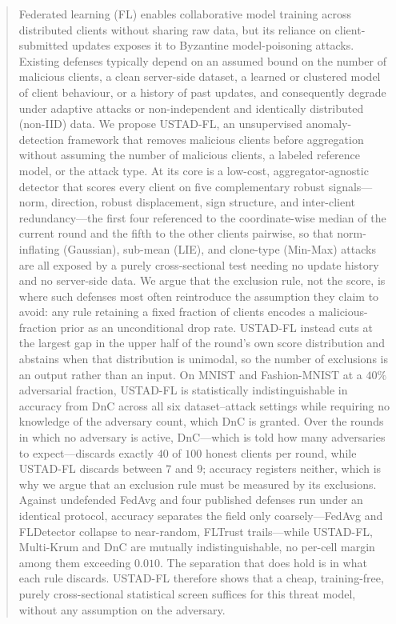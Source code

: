 \documentclass[journal]{IEEEtran}
\begin{document}
\begin{abstract}
Federated learning (FL) enables collaborative model training across distributed clients without sharing raw data, but its reliance on client-submitted updates exposes it to Byzantine model-poisoning attacks. Existing defenses typically depend on an assumed bound on the number of malicious clients, a clean server-side dataset, a learned or clustered model of client behaviour, or a history of past updates, and consequently degrade under adaptive attacks or non-independent and identically distributed (non-IID) data. We propose USTAD-FL, an unsupervised anomaly-detection framework that removes malicious clients before aggregation without assuming the number of malicious clients, a labeled reference model, or the attack type. At its core is a low-cost, aggregator-agnostic detector that scores every client on five complementary robust signals---norm, direction, robust displacement, sign structure, and inter-client redundancy---the first four referenced to the coordinate-wise median of the current round and the fifth to the other clients pairwise, so that norm-inflating (Gaussian), sub-mean (LIE), and clone-type (Min-Max) attacks are all exposed by a purely cross-sectional test needing no update history and no server-side data. We argue that the exclusion rule, not the score, is where such defenses most often reintroduce the assumption they claim to avoid: any rule retaining a fixed fraction of clients encodes a malicious-fraction prior as an unconditional drop rate. USTAD-FL instead cuts at the largest gap in the upper half of the round's own score distribution and abstains when that distribution is unimodal, so the number of exclusions is an output rather than an input. On MNIST and Fashion-MNIST at a $40\%$ adversarial fraction, USTAD-FL is statistically indistinguishable in accuracy from DnC across all six dataset--attack settings while requiring no knowledge of the adversary count, which DnC is granted. Over the rounds in which no adversary is active, DnC---which is told how many adversaries to expect---discards exactly $40$ of $100$ honest clients per round, while USTAD-FL discards between $7$ and $9$; accuracy registers neither, which is why we argue that an exclusion rule must be measured by its exclusions. Against undefended FedAvg and four published defenses run under an identical protocol, accuracy separates the field only coarsely---FedAvg and FLDetector collapse to near-random, FLTrust trails---while USTAD-FL, Multi-Krum and DnC are mutually indistinguishable, no per-cell margin among them exceeding $0.010$. The separation that does hold is in what each rule discards. USTAD-FL therefore shows that a cheap, training-free, purely cross-sectional statistical screen suffices for this threat model, without any assumption on the adversary.
\end{abstract}
\end{document}
